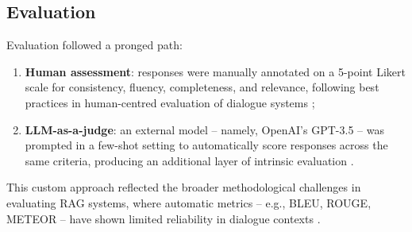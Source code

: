 \begin{spacing}{1.5}
\subsection{Evaluation}
Evaluation followed a pronged path:
\begin{enumerate}
      \item \textbf{Human assessment}: responses were manually annotated on a 5-point Likert scale for consistency, fluency, completeness, and relevance, following best practices in human-centred evaluation of dialogue systems \citep{abeysinghe_challenges_2024,van_der_lee_human_2021};
      \item \textbf{LLM-as-a-judge}: an external model -- namely, OpenAI’s GPT-3.5 -- was prompted in a few-shot setting to automatically score responses across the same criteria, producing an additional layer of intrinsic evaluation \citep{svikhnushina_approximating_2023}.
\end{enumerate}

This custom approach reflected the broader methodological challenges in evaluating RAG systems, where automatic metrics -- e.g., BLEU, ROUGE, METEOR -- have shown limited reliability in dialogue contexts \citep{deriu_survey_2020,liu_how_2016}.


\end{spacing}
